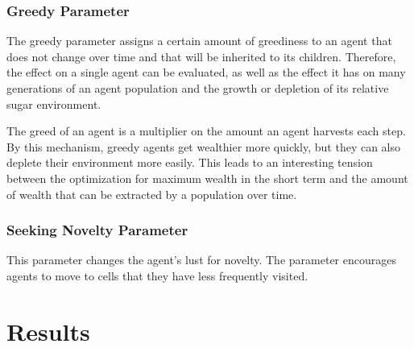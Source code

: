 \subsection{Greedy Parameter}

The greedy parameter assigns a certain amount of greediness to an agent that does not change over time and that will be inherited to its children. Therefore, the effect on a single agent can be evaluated, as well as the effect it has on many generations of an agent population and the growth or depletion of its relative sugar environment.

The greed of an agent is a multiplier on the amount an agent harvests each step. By this mechanism, greedy agents get wealthier more quickly, but they can also deplete their environment more easily. This leads to an interesting tension between the optimization for maximum wealth in the short term and the amount of wealth that can be extracted by a population over time.

\subsection{Seeking Novelty Parameter}
This parameter changes the agent's lust for novelty. The parameter encourages agents to move to cells that they have less frequently visited.

\chapter{Results}

